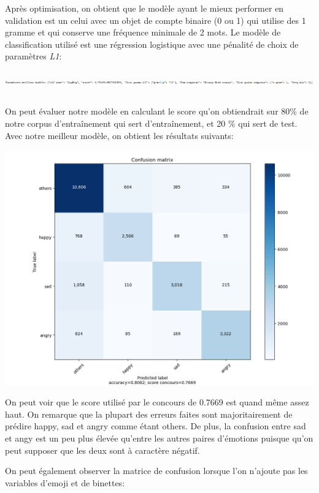 Après optimisation, on obtient que le modèle ayant le mieux performer en validation est un celui avec un objet de compte binaire (0 ou 1) qui utilise des 1 gramme et qui conserve une fréquence minimale de 2 mots. Le modèle de classification utilisé est une régression logistique avec une pénalité de choix de paramètres \emph{L1}:

\includegraphics[width=\linewidth,height=1cm,keepaspectratio]{images/dict_meilleur_model}

On peut évaluer notre modèle en calculant le score qu'on obtiendrait sur 80\% de notre corpus d'entraînement qui sert d'entraînement, et 20 \% qui sert de test. Avec notre meilleur modèle, on obtient les résultats suivants:

\includegraphics[width=\linewidth,keepaspectratio]{images/confusion_matrix_avec_features}

On peut voir que le score utilisé par le concours de 0.7669 est quand même assez haut. On remarque que la plupart des erreurs faites sont majoritairement de prédire happy, sad et angry comme étant others. De plus, la confusion entre sad et angy est un peu plus élevée qu'entre les autres paires d'émotions puisque qu'on peut supposer que les deux sont à caractère négatif.

On peut également observer la matrice de confusion lorsque l'on n'ajoute pas les variables d'emoji et de binettes:

